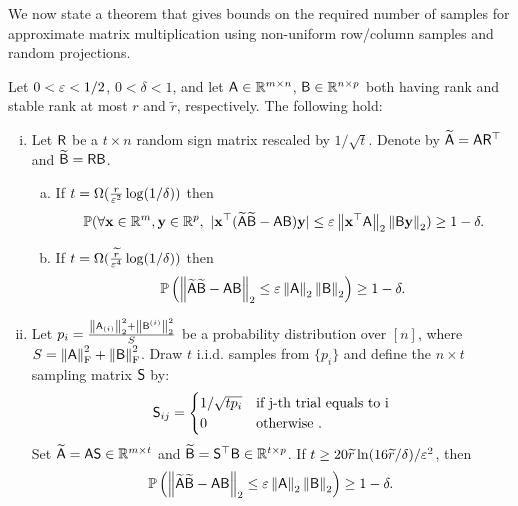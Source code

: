%
We now state a theorem that gives bounds on the required number of samples for approximate matrix multiplication using non-uniform row/column samples and random projections.
\begin{theorem}\label{thm:matrixmult}
Let $0< \varepsilon < 1/2$, $0<\delta<1$, and let ${\mathsf{A} }\in{\mathbb{R}^{m\times n}}$, ${\mathsf{B} }\in{\mathbb{R}^{ n\times p}}$ both having rank and stable rank at most $r$ and $\widetilde{r}$, respectively. The
following hold:
\begin{enumerate}[(i)]
 \item
Let ${\mathsf{R} }$ be a $t\times n$ random sign matrix rescaled by $1/\sqrt{t}$. Denote by $\widetilde{{\mathsf{A} }}= {\mathsf{A} }{\mathsf{R} }^\top$ and $\widetilde{{\mathsf{B} }}={\mathsf{R} }{\mathsf{B} }$.
\begin{enumerate}[(a)]
 \item
 If $t=\Omega( \frac{r}{\varepsilon^{2}} \log (1/\delta) )$ then
%
\[ \mathbb{P}( \forall \mathbf{x}\in\mathbb{R}^m, \mathbf{y}\in\mathbb{R}^p, \  |\mathbf{x}^\top (\widetilde{{\mathsf{A} }} \widetilde{{\mathsf{B} }} - {\mathsf{A} } {\mathsf{B} })\mathbf{y}| \leq \varepsilon \left\|\mathbf{x}^\top {\ensuremath{\mathsf{A} }}\right\|_2 \left\|{\mathsf{B} }\mathbf{y}\right\|_2) \geq 1-\delta.\]
%
\item
If $t=\Omega(\frac{\widetilde{r}}{\varepsilon^4} \log (1/\delta) )$ then
%
\[ \mathbb{P}\left(\left\|\widetilde{{\mathsf{A} }} \widetilde{{\mathsf{B} }} - {\mathsf{A} } {\mathsf{B} }\right\|_2 \leq \varepsilon \left\|{\mathsf{A} }\right\|_2 \left\|{\mathsf{B} }\right\|_2
\right) \geq 1- \delta. \]
%
\end{enumerate}
\item
Let $p_i =\frac{\left\|{\mathsf{A} }_{(i)}\right\|_2^2 + \left\|{\mathsf{B} }^{(i)}\right\|_2^2 }{S} $ be a probability distribution over $[n]$, where $S=\left\|{\mathsf{A} }\right\|_{\textrm{F}}^2+\left\|{\mathsf{B} }\right\|_{\textrm{F}}^2$. Draw $t$ i.i.d. samples from $\{p_i\}$ and define the $n\times t$ sampling matrix ${\mathsf{S} }$ by:
\[
{\mathsf{S} }_{ij} = \begin{cases} 1/\sqrt{tp_i}  &\mbox{if j-th trial equals to i} \\
0 & \mbox{otherwise }.
\end{cases}
\]
Set $\widetilde{{\mathsf{A} }} = {\mathsf{A} } {\mathsf{S} } \in\mathbb{R}^{m\times t}$ and $\widetilde{{\mathsf{B} }} = {\mathsf{S} }^\top {\ensuremath{\mathsf{B} }}\in\mathbb{R}^{t\times p}$. If $t\geq 20\widetilde{r} \ln ( 16\widetilde{r}/\delta) /\varepsilon^2 $, then
%
\[ \mathbb{P}\left(\left\|\widetilde{{\mathsf{A} }} \widetilde{{\mathsf{B} }} - {\mathsf{A} } {\mathsf{B} }\right\|_2 \leq \varepsilon \left\|{\mathsf{A} }\right\|_2 \left\|{\mathsf{B} }\right\|_2 \right) \geq 1- \delta. \]
%
%
\end{enumerate}
\end{theorem}
